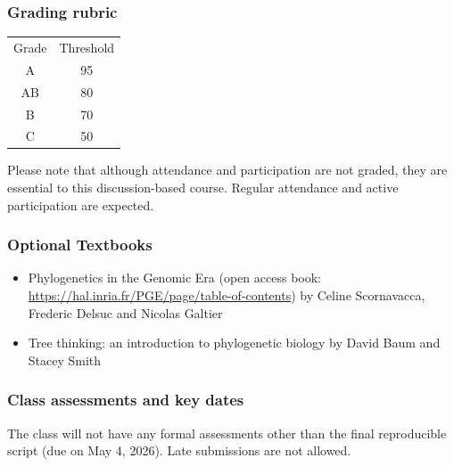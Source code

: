 \documentclass{article}
\begin{document}
\subsubsection*{Grading rubric}

\begin{table}[h]
    \begin{tabular}{c|c}
        Grade & Threshold \\
        A & 95 \\
        AB & 80 \\
        B & 70 \\
        C & 50
    \end{tabular}
\end{table}

Please note that although attendance and participation are not graded, they are essential to this discussion-based course. Regular attendance and active participation are expected.

\subsubsection*{Optional Textbooks}
\begin{itemize}
    \item Phylogenetics in the Genomic Era (open access book: \url{https://hal.inria.fr/PGE/page/table-of-contents}) by Celine Scornavacca, Frederic Delsuc and Nicolas Galtier
    \item Tree thinking: an introduction to phylogenetic biology by David Baum and Stacey Smith
\end{itemize}


\subsubsection*{Class assessments and key dates}
The class will not have any formal assessments other than the final reproducible script (due on May 4, 2026). Late submissions are not allowed.
\end{document}

